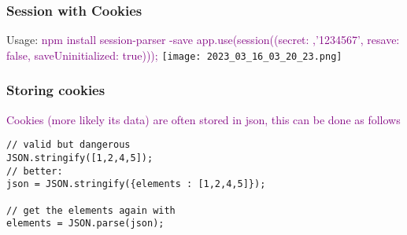 \documentclass[main.tex,fontsize=8pt,paper=a4,paper=portrait,DIV=calc,]{scrartcl}
\begin{document}
\subsubsection{Session with Cookies}
Usage:\newline
\textcolor{purple}{npm install session-parser -save\newline
app.use(session((secret: ,'1234567', resave: false, saveUninitialized: true)));}\newline
\texttt{[image: 2023\_03\_16\_03\_20\_23.png]}

\subsubsection{Storing cookies}
\textcolor{purple}{Cookies (more likely its data) are often stored in json, this can be done as follows}\newline
\begin{lstlisting}
// valid but dangerous
JSON.stringify([1,2,4,5]);
// better:
json = JSON.stringify({elements : [1,2,4,5]});

// get the elements again with 
elements = JSON.parse(json); 
\end{lstlisting}
\end{document}
